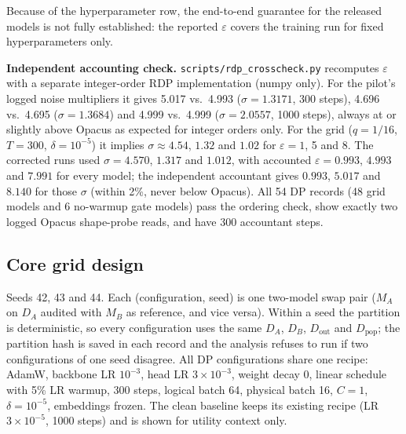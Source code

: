 \documentclass[11pt,a4paper]{article}
\begin{document}
Because of the hyperparameter row, the end-to-end guarantee for the released models is not fully
established: the reported $\varepsilon$ covers the training run for fixed hyperparameters only.

\textbf{Independent accounting check.} \texttt{scripts/rdp\_crosscheck.py} recomputes $\varepsilon$ with a
separate integer-order RDP implementation (numpy only). For the pilot's logged noise multipliers it gives
5.017 vs.\ 4.993 ($\sigma = 1.3171$, 300 steps), 4.696 vs.\ 4.695 ($\sigma = 1.3684$) and 4.999 vs.\ 4.999
($\sigma = 2.0557$, 1000 steps), always at or slightly above Opacus as expected for integer orders only.
For the grid ($q = 1/16$, $T = 300$, $\delta = 10^{-5}$) it implies $\sigma \approx 4.54$, $1.32$ and $1.02$
for $\varepsilon = 1$, 5 and 8. The corrected runs used $\sigma = 4.570$, $1.317$ and $1.012$, with accounted
$\varepsilon = 0.993$, $4.993$ and $7.991$ for every model; the independent accountant gives $0.993$, $5.017$ and
$8.140$ for those $\sigma$ (within 2\%, never below Opacus). All 54 DP records (48 grid models and 6 no-warmup gate
models) pass the ordering check, show exactly two logged Opacus shape-probe reads, and have 300 accountant
steps.

\subsection{Core grid design}

Seeds 42, 43 and 44. Each (configuration, seed) is one two-model swap pair ($M_A$ on $D_A$ audited with
$M_B$ as reference, and vice versa). Within a seed the partition is deterministic, so every configuration
uses the same $D_A$, $D_B$, $D_{\text{out}}$ and $D_{\text{pop}}$; the partition hash is saved in each record and
the analysis refuses to run if two configurations of one seed disagree. All DP configurations share one
recipe: AdamW, backbone LR $10^{-3}$, head LR $3\times10^{-3}$, weight decay 0, linear schedule with 5\% LR
warmup, 300 steps, logical batch 64, physical batch 16, $C = 1$, $\delta = 10^{-5}$, embeddings frozen.
The clean baseline keeps its existing recipe (LR $3\times10^{-5}$, 1000 steps) and is shown for utility
context only.
\end{document}
